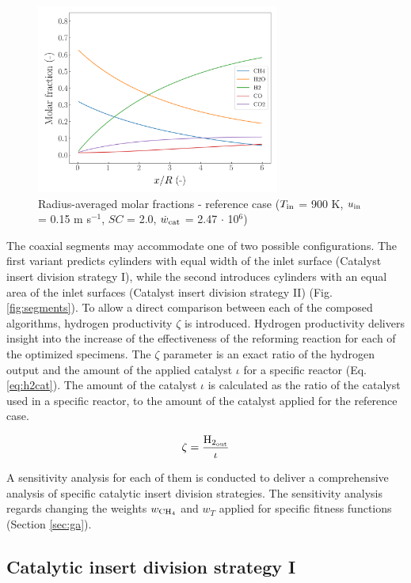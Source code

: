 \documentclass[preprint,12pt]{elsarticle}
\begin{document}
\begin{figure}[h]
\centering
\includegraphics[width=80mm]{ref-avg.png}
\caption{\label{fig:ref-avg} Radius-averaged molar fractions - reference case ($T_{\rm{in}}$ = 900 K, $u_{\rm{in}}$ = 0.15 m s$^{-1}$, $SC$ = 2.0, $\dot{w}_{\rm{cat}}$ = 2.47 $\cdot$ 10$^{6}$)}
\end{figure}

The coaxial segments may accommodate one of two possible configurations. The first variant predicts cylinders with equal width of the inlet surface (Catalyst insert division strategy I), while the second introduces cylinders with an equal area of the inlet surfaces (Catalyst insert division strategy II) (Fig. \ref{fig:segments}). To allow a direct comparison between each of the composed algorithms, hydrogen productivity $\zeta$ is introduced. Hydrogen productivity delivers insight into the increase of the effectiveness of the reforming reaction for each of the optimized specimens. The $\zeta$ parameter is an exact ratio of the hydrogen output and the amount of the applied catalyst $\iota$  for a specific reactor (Eq. \eqref{eq:h2cat}).  The amount of the catalyst $\iota$ is calculated as the ratio of the catalyst used in a specific reactor, to the amount of the catalyst applied for the reference case.
 
 \begin{equation}
 \label{eq:h2cat}
 \zeta = \frac{\rm{H_{2_{out}}}}{\iota}
  \end{equation}

A sensitivity analysis for each of them is conducted to deliver a comprehensive analysis of specific catalytic insert division strategies. The sensitivity analysis regards changing the weights $w_{\rm{CH_4}}$ and $w_T$ applied for specific fitness functions (Section \ref{sec:ga}).

\subsection{Catalytic insert division strategy I}
\end{document}

